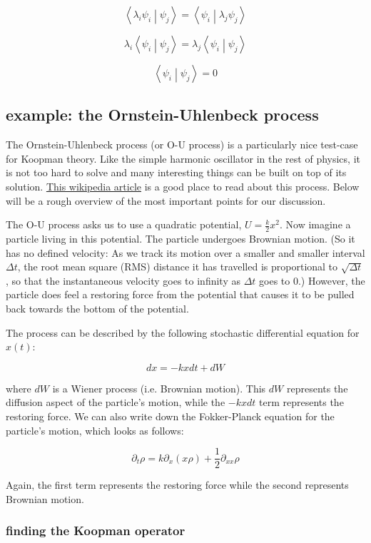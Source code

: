 \documentclass[]{article}
\newcommand{\braket}[2]{\left\langle #1 \middle| #2 \right\rangle}
\newcommand{\p}[1]{\left( #1 \right)}
\begin{document}
$$
\braket{\lambda_i \psi_i}{\psi_j}
= \braket{\psi_i}{\lambda_j\psi_j}
$$

$$
\lambda_i \braket{\psi_i}{\psi_j} = \lambda_j \braket{\psi_i}{\psi_j}
$$

$$
\braket{\psi_i}{\psi_j} = 0
$$







\subsection{example: the Ornstein-Uhlenbeck process}

The Ornstein-Uhlenbeck process (or O-U process) is a particularly nice test-case for Koopman theory. Like the simple harmonic oscillator in the rest of physics, it is not too hard to solve and many interesting things can be built on top of its solution. \href{https://en.wikipedia.org/wiki/Ornstein%E2%80%93Uhlenbeck_process}{This wikipedia article} is a good place to read about this process. Below will be a rough overview of the most important points for our discussion.

The O-U process asks us to use a quadratic potential, $U = \frac{k}{2}x^2$. Now imagine a particle living in this potential. The particle undergoes Brownian motion. (So it has no defined velocity: As we track its motion over a smaller and smaller interval $\Delta t$, the root mean square (RMS) distance it has travelled is proportional to $\sqrt{\Delta t}$, so that the instantaneous velocity goes to infinity as $\Delta t$ goes to 0.) However, the particle does feel a restoring force from the potential that causes it to be pulled back towards the bottom of the potential.

The process can be described by the following stochastic differential equation for $x(t)$:

$$
dx = -kx dt + dW
$$

where $dW$ is a Wiener process (i.e. Brownian motion). This $dW$ represents the diffusion aspect of the particle's motion, while the $-kxdt$ term represents the restoring force. We can also write down the Fokker-Planck equation for the particle's motion, which looks as follows:

$$
\partial_t \rho = k \partial_x \p{x \rho} + \frac{1}{2} \partial_{xx} \rho
$$

Again, the first term represents the restoring force while the second represents Brownian motion.

\subsubsection{finding the Koopman operator}
\end{document}
